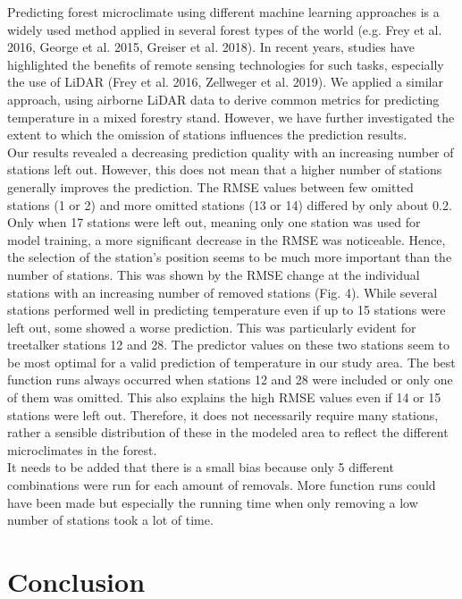\documentclass[5p]{elsarticle} %
\begin{document}
Predicting forest microclimate using different machine learning approaches is a widely used method applied in several forest types of the world (e.g. Frey et al. 2016, George et al. 2015, Greiser et al. 2018). In recent years, studies have highlighted the benefits of remote sensing technologies for such tasks, especially the use of LiDAR (Frey et al. 2016, Zellweger et al. 2019). We applied a similar approach, using airborne LiDAR data to derive common metrics for predicting temperature in a mixed forestry stand. However, we have further investigated the extent to which the omission of stations influences the prediction results.\\
Our results revealed a decreasing prediction quality with an increasing number of stations left out. However, this does not mean that a higher number of stations generally improves the prediction. The RMSE values between few omitted stations (1 or 2) and more omitted stations (13 or 14) differed by only about 0.2. Only when 17 stations were left out, meaning only one station was used for model training, a more significant decrease in the RMSE was noticeable. Hence, the selection of the station's position seems to be much more important than the number of stations. This was shown by the RMSE change at the individual stations with an increasing number of removed stations (Fig. 4). While several stations performed well in predicting temperature even if up to 15 stations were left out, some showed a worse prediction. This was particularly evident for treetalker stations 12 and 28. The predictor values on these two stations seem to be most optimal for a valid prediction of temperature in our study area. The best function runs always occurred when stations 12 and 28 were included or only one of them was omitted. This also explains the high RMSE values even if 14 or 15 stations were left out. Therefore, it does not necessarily require many stations, rather a sensible distribution of these in the modeled area to reflect the different microclimates in the forest. \\
It needs to be added that there is a small bias because only 5 different combinations were run for each amount of removals. More function runs could have been made but especially the running time when only removing a low number of stations took a lot of time.


\hypertarget{conclusion}{%
\section{Conclusion}\label{conclusion}}
\end{document}
